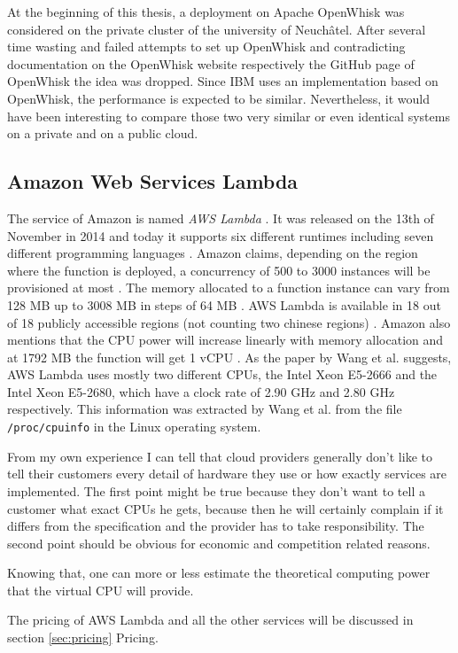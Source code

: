 \begin{remark}
At the beginning of this thesis, a deployment on Apache OpenWhisk was considered on the private cluster of the university of Neuchâtel. After several time wasting and failed attempts to set up OpenWhisk and contradicting documentation on the OpenWhisk website respectively the GitHub page of OpenWhisk the idea was dropped. Since \gls{IBM} uses an implementation based on OpenWhisk, the performance is expected to be similar. Nevertheless, it would have been interesting to compare those two very similar or even identical systems on a private and on a public cloud.
\end{remark}

\subsection{Amazon Web Services Lambda}

The service of Amazon is named \textit{\gls{AWS} Lambda} \cite{AWSLambda}. It was released on the 13th of November in 2014 \cite{AWSLambdaRelease} and today it supports six different runtimes including seven different programming languages \cite{AWSLambdaLanguages}. Amazon claims, depending on the region where the function is deployed, a concurrency of 500 to 3000 instances will be provisioned at most \cite{AWSLambdaScaling}. The memory allocated to a function instance can vary from 128 \gls{MB} up to 3008 \gls{MB} in steps of 64 \gls{MB} \cite{AWSLambdaConfig}. \gls{AWS} Lambda is available in 18 out of 18 publicly accessible regions (not counting two chinese regions) \cite{AWSRegions}. Amazon also mentions that the \gls{CPU} power will increase linearly with memory allocation and at 1792 \gls{MB} the function will get 1 \gls{vCPU} \cite{AWSLambdaConfig}. As the paper by Wang et al. \cite{216063} suggests, AWS Lambda uses mostly two different \gls{CPU}s, the Intel Xeon E5-2666 and the Intel Xeon E5-2680, which have a clock rate of 2.90 \gls{GHz} and 2.80 \gls{GHz} respectively. This information was extracted by Wang et al. from the file \texttt{/proc/cpuinfo} in the Linux operating system.
\begin{remark} From my own experience I can tell that cloud providers generally don't like to tell their customers every detail of hardware they use or how exactly services are implemented. The first point might be true because they don't want to tell a customer what exact \gls{CPU}s he gets, because then he will certainly complain if it differs from the specification and the provider has to take responsibility. The second point should be obvious for economic and competition related reasons.
\end{remark}
Knowing that, one can more or less estimate the theoretical computing power that the virtual \gls{CPU} will provide. 
\begin{remark}
The pricing of \gls{AWS} Lambda and all the other services will be discussed in section \ref{sec:pricing} Pricing.
\end{remark}

